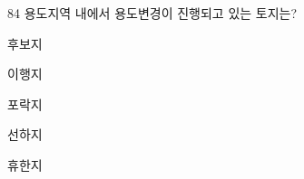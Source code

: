 \begin{question}{84}
용도지역 내에서 용도변경이 진행되고 있는 토지는?
\begin{choices}
  \item 후보지
  \item 이행지
  \item 포락지
  \item 선하지
  \item 휴한지
\end{choices}
\end{question}
